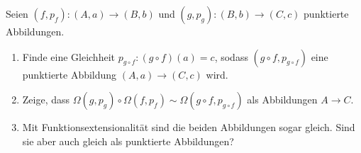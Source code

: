 \documentclass{uebung}
\begin{document}

\begin{exercise}
  Seien $(f,p_f):(A,a)\to (B,b)$ und $(g,p_g):(B,b)\to (C,c)$ punktierte Abbildungen.
  \begin{enumerate}
    \item Finde eine Gleichheit $p_{g\circ f}:(g\circ f)(a)=c$, sodass $(g\circ f,p_{g\circ f})$ eine punktierte Abbildung $(A,a)\to (C,c)$ wird.
    \item Zeige, dass $\Omega(g,p_g)\circ\Omega(f,p_f) \sim \Omega(g\circ f,p_{g\circ f})$ als Abbildungen $A\to C$.
    \item Mit Funktionsextensionalität sind die beiden Abbildungen sogar gleich.
      Sind sie aber auch gleich als punktierte Abbildungen?
  \end{enumerate}
\end{exercise}
\end{document}
